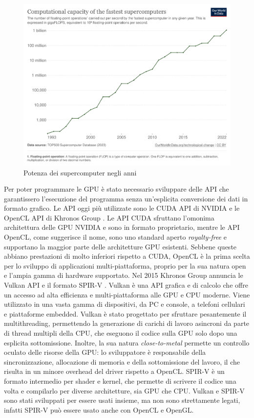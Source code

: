 \begin{figure}[ht]
\centering
\includegraphics[width=.9\linewidth]{images/chapter1/supercomputer_flops.png}
\caption{Potenza dei supercomputer negli anni}
\label{fig:supercomputer_flops}
\end{figure}


Per poter programmare le \gls{GPU} è stato necessario sviluppare delle \gls{API} che garantissero l'esecuzione del programma senza un'esplicita conversione dei dati in formato grafico. Le \gls{API} oggi più utilizzate sono le \gls{CUDA} \gls{API} di NVIDIA \cite[]{NVIDIA:CUDA} e le OpenCL \gls{API} di Khronos Group \cite[]{KG:OpenCL}. Le \gls{API} \gls{CUDA} sfruttano l'omonima architettura delle \gls{GPU} NVIDIA e sono in formato proprietario, mentre le \gls{API} OpenCL, come suggerisce il nome, sono uno standard aperto \textit{royalty-free} e supportano la maggior parte delle architetture \gls{GPU} esistenti. Sebbene queste abbiano prestazioni di molto inferiori rispetto a CUDA, OpenCL è la prima scelta per lo sviluppo di applicazioni multi-piattaforma, proprio per la sua natura open e l'ampia gamma di hardware supportato. Nel 2015 Khronos Group annuncia le Vulkan \gls{API} \cite[]{KG:Vulkan} e il formato \gls{SPIR-V} \cite[]{KG:SPIR-V}. Vulkan è una \gls{API} grafica e di calcolo che offre un accesso ad alta efficienza e multi-piattaforma alle \gls{GPU} e \gls{CPU} moderne. Viene utilizzato in una vasta gamma di dispositivi, da PC e console, a telefoni cellulari e piattaforme embedded. Vulkan è stato progettato per sfruttare pesantemente il multithreading, permettendo la generazione di carichi di lavoro asincroni da parte di thread multipli della \gls{CPU}, che eseguono il codice sulla \gls{GPU} solo dopo una esplicita sottomissione. Inoltre, la sua natura \textit{close-to-metal} permette un controllo oculato delle risorse della \gls{GPU}: lo sviluppatore è responsabile della sincronizzazione, allocazione di memoria e della sottomissione del lavoro, il che risulta in un minore overhead del driver rispetto a OpenCL. \gls{SPIR-V} è un formato intermedio per shader e kernel, che permette di scrivere il codice una volta e compilarlo per diverse architetture, sia \gls{GPU} che \gls{CPU}. Vulkan e \gls{SPIR-V} sono stati sviluppati per essere usati insieme, ma non sono strettamente legati, infatti \gls{SPIR-V} può essere usato anche con OpenCL e OpenGL.

